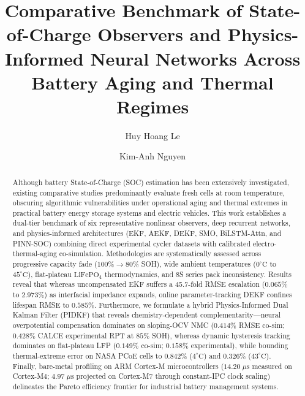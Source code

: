 \documentclass[preprint,12pt]{elsarticle}
\providecommand{\upmu}{\mu}
\begin{document}
\begin{frontmatter}

\title{Comparative Benchmark of State-of-Charge Observers and Physics-Informed Neural Networks Across Battery Aging and Thermal Regimes}

\author[inst1]{Huy Hoang Le}

\author[inst2]{Kim-Anh Nguyen}



\begin{abstract}
Although battery State-of-Charge (SOC) estimation has been extensively investigated, existing comparative studies predominantly evaluate fresh cells at room temperature, obscuring algorithmic vulnerabilities under operational aging and thermal extremes in practical battery energy storage systems and electric vehicles. This work establishes a dual-tier benchmark of six representative nonlinear observers, deep recurrent networks, and physics-informed architectures (EKF, AEKF, DEKF, SMO, BiLSTM-Attn, and PINN-SOC) combining direct experimental cycler datasets with calibrated electro-thermal-aging co-simulation. Methodologies are systematically assessed across progressive capacity fade ($100\% \rightarrow 80\%$ SOH), wide ambient temperatures ($0^\circ\text{C}$ to $45^\circ\text{C}$), flat-plateau $\text{LiFePO}_4$ thermodynamics, and 8S series pack inconsistency. Results reveal that whereas uncompensated EKF suffers a 45.7-fold RMSE escalation ($0.065\%$ to $2.973\%$) as interfacial impedance expands, online parameter-tracking DEKF confines lifespan RMSE to $0.585\%$. Furthermore, we formulate a hybrid Physics-Informed Dual Kalman Filter (PIDKF) that reveals chemistry-dependent complementarity---neural overpotential compensation dominates on sloping-OCV NMC ($0.414\%$ RMSE co-sim; $0.428\%$ CALCE experimental RPT at $85\%$ SOH), whereas dynamic hysteresis tracking dominates on flat-plateau LFP ($0.149\%$ co-sim; $0.158\%$ experimental), while bounding thermal-extreme error on NASA PCoE cells to $0.842\%$ ($4^\circ\text{C}$) and $0.326\%$ ($43^\circ\text{C}$). Finally, bare-metal profiling on ARM Cortex-M microcontrollers ($14.20\;\upmu\mathrm{s}$ measured on Cortex-M4; $4.97\;\upmu\mathrm{s}$ projected on Cortex-M7 through constant-IPC clock scaling) delineates the Pareto efficiency frontier for industrial battery management systems.
\end{abstract}


\end{frontmatter}
\end{document}
